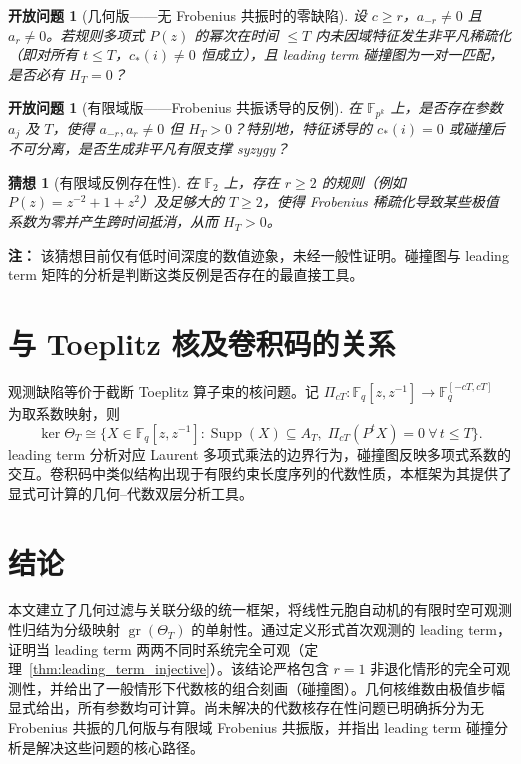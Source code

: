 \documentclass[11pt,a4paper]{ctexart}
\newtheorem{openproblem}[theorem]{开放问题}
\newtheorem{conjecture}[theorem]{猜想}
\newcommand{\F}{\mathbb{F}}
\DeclareMathOperator{\Supp}{Supp}
\DeclareMathOperator{\gr}{gr}
\begin{document}
\begin{openproblem}[几何版——无 Frobenius 共振时的零缺陷]\label{prob:full_obs_geo}
设 \(c\ge r\)，\(a_{-r}\neq0\) 且 \(a_r\neq0\)。若规则多项式 \(P(z)\) 的幂次在时间 \(\le T\) 内未因域特征发生非平凡稀疏化（即对所有 \(t\le T\)，\(c_*(i)\neq0\) 恒成立），且 leading term 碰撞图为一对一匹配，是否必有 \(H_T=0\)？
\end{openproblem}

\begin{openproblem}[有限域版——Frobenius 共振诱导的反例]\label{prob:full_obs_frob}
在 \(\F_{p^k}\) 上，是否存在参数 \(a_j\) 及 \(T\)，使得 \(a_{-r},a_r\neq0\) 但 \(H_T>0\)？特别地，特征诱导的 \(c_*(i)=0\) 或碰撞后不可分离，是否生成非平凡有限支撑 syzygy？
\end{openproblem}

\begin{conjecture}[有限域反例存在性]\label{conj:frob_counter}
在 \(\F_2\) 上，存在 \(r\ge2\) 的规则（例如 \(P(z)=z^{-2}+1+z^2\)）及足够大的 \(T\ge 2\)，使得 Frobenius 稀疏化导致某些极值系数为零并产生跨时间抵消，从而 \(H_T>0\)。
\end{conjecture}

\textbf{注：} 该猜想目前仅有低时间深度的数值迹象，未经一般性证明。碰撞图与 leading term 矩阵的分析是判断这类反例是否存在的最直接工具。

\section{与 Toeplitz 核及卷积码的关系}
观测缺陷等价于截断 Toeplitz 算子束的核问题。记 \(\Pi_{cT}: \F_q[z,z^{-1}]\to \F_q^{[-cT,cT]}\) 为取系数映射，则
\[
\ker\Theta_T \cong \bigl\{ X\in\F_q[z,z^{-1}] : \Supp(X)\subseteq A_T,\;
\Pi_{cT}(P^t X)=0 \ \forall\, t\le T \bigr\}.
\]
leading term 分析对应 Laurent 多项式乘法的边界行为，碰撞图反映多项式系数的交互。卷积码中类似结构出现于有限约束长度序列的代数性质，本框架为其提供了显式可计算的几何–代数双层分析工具。

\section{结论}
本文建立了几何过滤与关联分级的统一框架，将线性元胞自动机的有限时空可观测性归结为分级映射 \(\gr(\Theta_T)\) 的单射性。通过定义形式首次观测的 leading term，证明当 leading term 两两不同时系统完全可观（定理~\ref{thm:leading_term_injective}）。该结论严格包含 \(r=1\) 非退化情形的完全可观测性，并给出了一般情形下代数核的组合刻画（碰撞图）。几何核维数由极值步幅显式给出，所有参数均可计算。尚未解决的代数核存在性问题已明确拆分为无 Frobenius 共振的几何版与有限域 Frobenius 共振版，并指出 leading term 碰撞分析是解决这些问题的核心路径。
\end{document}
